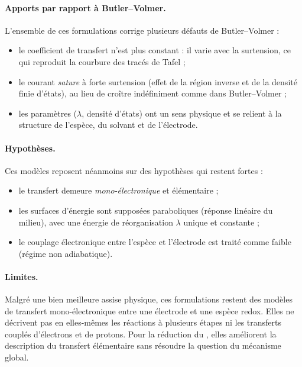\paragraph{Apports par rapport à Butler--Volmer.}
L'ensemble de ces formulations corrige plusieurs défauts de Butler--Volmer
\cite{henstridgeMarcusHushChidsey2012,
romanIdentifyingOptimalElectrocatalysts2017} :
\begin{itemize}
  \item le coefficient de transfert n'est plus constant : il varie avec la
        surtension, ce qui reproduit la courbure des tracés de Tafel ;
  \item le courant \emph{sature} à forte surtension (effet de la région
        inverse et de la densité finie d'états), au lieu de croître
        indéfiniment comme dans Butler--Volmer ;
  \item les paramètres ($\lambda$, densité d'états) ont un sens physique et se
        relient à la structure de l'espèce, du solvant et de l'électrode.
\end{itemize}

\paragraph{Hypothèses.}
Ces modèles reposent néanmoins sur des hypothèses qui restent fortes :
\begin{itemize}
  \item le transfert demeure \emph{mono-électronique} et élémentaire ;
  \item les surfaces d'énergie sont supposées paraboliques (réponse linéaire
        du milieu), avec une énergie de réorganisation $\lambda$ unique et
        constante ;
  \item le couplage électronique entre l'espèce et l'électrode est traité
        comme faible (régime non adiabatique).
\end{itemize}

\paragraph{Limites.}
Malgré une bien meilleure assise physique, ces formulations restent des
modèles de transfert mono-électronique entre une électrode et une espèce
redox. Elles ne décrivent pas en elles-mêmes les réactions à plusieurs
étapes ni les transferts couplés d'électrons et de protons. Pour la
réduction du , elles améliorent la description du transfert
élémentaire sans résoudre la question du mécanisme global.

